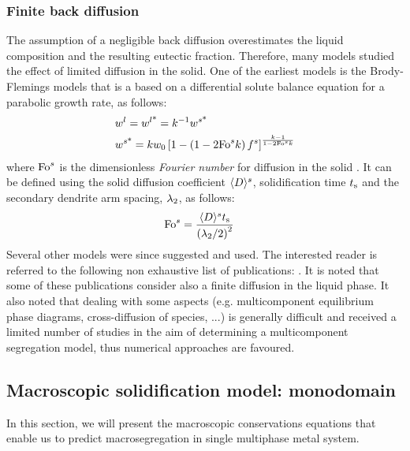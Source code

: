 \subsubsection*{Finite back diffusion}
The assumption of a negligible back diffusion overestimates the liquid composition
and the resulting eutectic fraction. Therefore, many models studied the effect of limited diffusion in the solid. 
One of the earliest models is the Brody-Flemings models \citep{brody_solute_1966} that is a based on a differential solute balance equation for a parabolic growth rate, as follows:
\begin{align}
\label{eq:brodyflemings}
& {w}^l= {w}^{l \text{*}}  = k^{-1}  {w}^{s \text{*}}  \\
& {w}^{s \text{*}} = k {w}_0 \left[  1 - \left(  1 - 2 \text{Fo}^s k  \right) {f^s}  \right]^{\frac{k-1}{1 - 2 \text{Fo}^s k }}
\end{align}
where $\text{Fo}^s$ is the dimensionless \emph{Fourier number} for diffusion in the solid \citep{dantzig_solidification_2009}. 
It can be defined using the solid diffusion coefficient $\langle D \rangle^s$, solidification time $t_\text{s}$ and the secondary 
dendrite arm spacing, ${\lambda}_{2}$, as follows: 
\begin{align}
\label{eq:fouriersolid}
& \text{Fo}^s = \frac{\langle D \rangle^s t_\text{s}}{\left( {\lambda}_{2} / 2 \right)^2}
\end{align}
Several other models were since suggested and used. The interested reader is referred to the following non 
exhaustive list of publications: \citet{clyne_solute_1981,kobayashi_solute_1988,ni_volume-averaged_1991,wang_multiphase_1993,
combeau_modeling_1996,martorano_solutal_2003,tourret_generalized_2009}. It is noted that some of these publications consider 
also a finite diffusion in the liquid phase. It also noted that dealing with some aspects 
(e.g. multicomponent equilibrium phase diagrams, cross-diffusion of species, ...) is generally difficult
and received a limited number of studies in the aim of determining a multicomponent segregation model, thus numerical approaches are favoured.

\subsection{Macroscopic solidification model: monodomain} \label{sec:monodomain}
In this section, we will present the macroscopic conservations equations that enable us to predict 
macrosegregation in single multiphase metal system.
